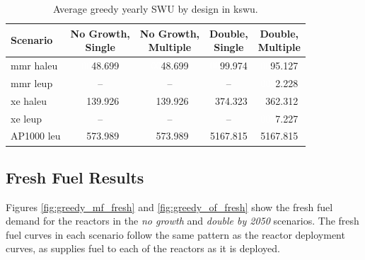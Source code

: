 \begin{table}[H]
  \centering
  \caption{Average greedy yearly SWU by design in k\gls{swu}.}
  \label{tab:greedy_swu_avg}
  \begin{tabular}{l c c c c}
     \toprule
     Scenario & \shortstack{No Growth,\\ Single} & \shortstack{No Growth,\\ Multiple} & \shortstack{Double,\\ Single} & \shortstack{Double,\\ Multiple}  \\
     \midrule
     \gls{mmr} \gls{haleu}   & \textcolor{white}{00}48.699  & \textcolor{white}{00}48.699  & \textcolor{white}{00}99.974   & \textcolor{white}{00}95.127   \\
     \gls{mmr} \gls{leup}    & --      & --      & --       & \textcolor{white}{000}2.228    \\
     \gls{xe} \gls{haleu}    & \textcolor{white}{0}139.926 & \textcolor{white}{0}139.926 & \textcolor{white}{0}374.323  & \textcolor{white}{0}362.312  \\
     \gls{xe} \gls{leup}     & --      & --      & --       & \textcolor{white}{000}7.227    \\
     AP1000 \gls{leu}        & \textcolor{white}{0}573.989 & \textcolor{white}{0}573.989 & 5167.815 & 5167.815 \\
     \bottomrule
  \end{tabular}
\end{table}



\subsection{Fresh Fuel Results}
\label{sec:greedy_fresh}

Figures \ref{fig:greedy_mf_fresh} and \ref{fig:greedy_of_fresh} show the fresh fuel demand for the reactors in the \textit{no growth} and \textit{double by 2050} scenarios. The fresh fuel curves in each scenario follow the same pattern as the reactor deployment curves, as \cyclus supplies fuel to each of the reactors as it is deployed.


